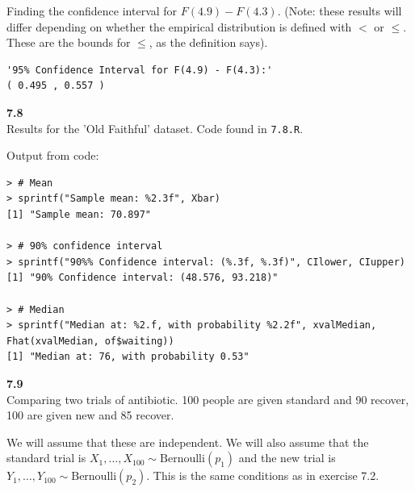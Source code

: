\medskip\noindent
Finding the confidence interval for $F(4.9) - F(4.3)$. (Note: these results will
differ depending on whether the empirical distribution is defined with $<$ or $\leq$.
These are the bounds for $\leq$, as the definition says).

\begin{lstlisting}[style=RSyntax, title=R]
'95% Confidence Interval for F(4.9) - F(4.3):'
( 0.495 , 0.557 )
\end{lstlisting}

\bigskip\noindent
\textbf{7.8}\\  %
Results for the 'Old Faithful' dataset. Code found in \texttt{7.8.R}.

Output from code:
\begin{lstlisting}[style=RSyntax, title=R]
> # Mean
> sprintf("Sample mean: %2.3f", Xbar)
[1] "Sample mean: 70.897"

> # 90% confidence interval
> sprintf("90%% Confidence interval: (%.3f, %.3f)", CIlower, CIupper)
[1] "90% Confidence interval: (48.576, 93.218)"

> # Median
> sprintf("Median at: %2.f, with probability %2.2f", xvalMedian, Fhat(xvalMedian, of$waiting))
[1] "Median at: 76, with probability 0.53"
\end{lstlisting}

\bigskip\noindent
\textbf{7.9}\\  %
Comparing two trials of antibiotic. 100 people are given standard and 90 recover,
100 are given new and 85 recover.

\medskip\noindent
We will assume that these are independent. We will also assume that the
standard trial is $X_1,\ldots, X_{100}\sim\text{Bernoulli}(p_1)$ and the new trial is
$Y_1,\ldots, Y_{100}\sim\text{Bernoulli}(p_2)$. This is the same conditions
as in exercise 7.2.

